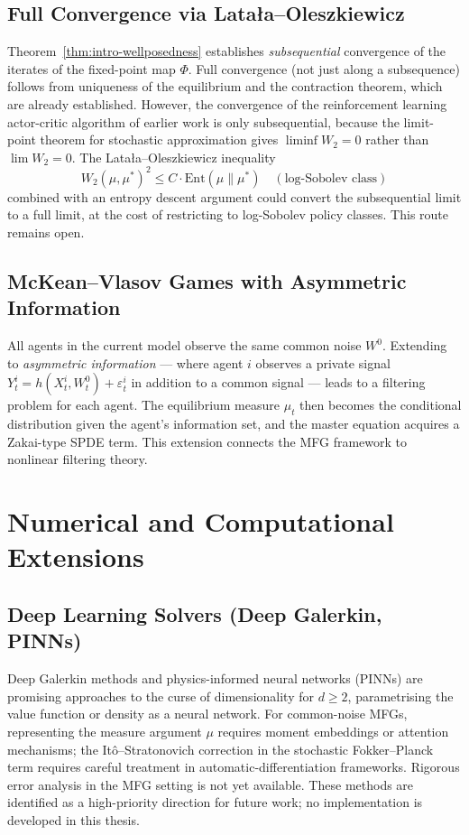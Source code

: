 \subsection{Full Convergence via Lata\l{}a--Oleszkiewicz}

Theorem~\ref{thm:intro-wellposedness} establishes \emph{subsequential} convergence
of the iterates of the fixed-point map $\Phi$. Full convergence (not just along a
subsequence) follows from uniqueness of the equilibrium and the contraction theorem,
which are already established. However, the convergence of the reinforcement
learning actor-critic algorithm of earlier work is only subsequential, because
the limit-point theorem for stochastic approximation gives $\liminf W_2 = 0$
rather than $\lim W_2 = 0$. The Lata\l{}a--Oleszkiewicz inequality
\[
    W_2(\mu, \mu^*)^2 \le C \cdot \mathrm{Ent}(\mu \| \mu^*)
    \quad (\text{log-Sobolev class})
\]
combined with an entropy descent argument could convert the subsequential limit
to a full limit, at the cost of restricting to log-Sobolev policy classes. This
route remains open.

\subsection{McKean--Vlasov Games with Asymmetric Information}

All agents in the current model observe the same common noise $W^0$. Extending to
\emph{asymmetric information} --- where agent $i$ observes a private signal
$Y_t^i = h(X_t^i, W^0_t) + \varepsilon_t^i$ in addition to a common signal ---
leads to a filtering problem for each agent. The equilibrium measure $\mu_t$ then
becomes the conditional distribution given the agent's information set, and the
master equation acquires a Zakai-type SPDE term. This extension connects the MFG
framework to nonlinear filtering theory.

\section{Numerical and Computational Extensions}
\label{sec:fut-numerical}

\subsection{Deep Learning Solvers (Deep Galerkin, PINNs)}

Deep Galerkin methods \citep{sirignano2018} and physics-informed neural networks
(PINNs) are promising approaches to the curse of dimensionality for $d \ge 2$,
parametrising the value function or density as a neural network. For common-noise
MFGs, representing the measure argument $\mu$ requires moment embeddings or
attention mechanisms; the It\^{o}--Stratonovich correction in the stochastic
Fokker--Planck term requires careful treatment in automatic-differentiation
frameworks. Rigorous error analysis in the MFG setting is not yet available.
These methods are identified as a high-priority direction for future work;
no implementation is developed in this thesis.

